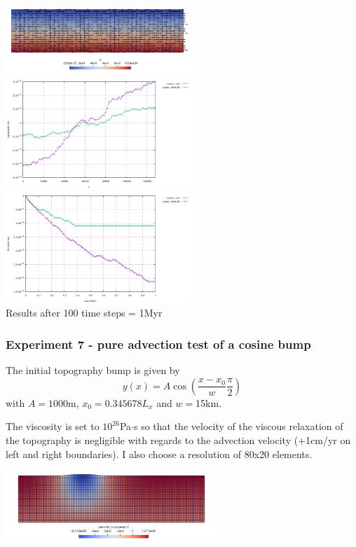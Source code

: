 \begin{center}
\includegraphics[width=7cm]{python_codes/fieldstone_54/images/exp6/velp}\\
\includegraphics[width=7cm]{python_codes/fieldstone_54/images/exp6/surface.pdf}
\includegraphics[width=7cm]{python_codes/fieldstone_54/images/exp6/elevation.pdf}\\
{\scriptsize Results after 100 time steps = 1Myr}
\end{center}

\subsubsection*{Experiment 7 - pure advection test of a cosine bump}

The initial topography bump is given by
\[
y(x)=A \cos \left( \frac{x-x_0}{w} \frac{\pi}{2} \right)
\]
with $A=1000$m, $x_0=0.345678L_x$ and $w=$15km.

The viscosity is set to $10^{26}$Pa$\cdot$s so that the velocity of the 
viscous relaxation of the topography is negligible with regards to the advection velocity
(+1cm/yr on left and right boundaries). I also choose a resolution of 80x20 elements.

\begin{center}
\includegraphics[width=8cm]{python_codes/fieldstone_54/images/exp7/v}
\end{center}

